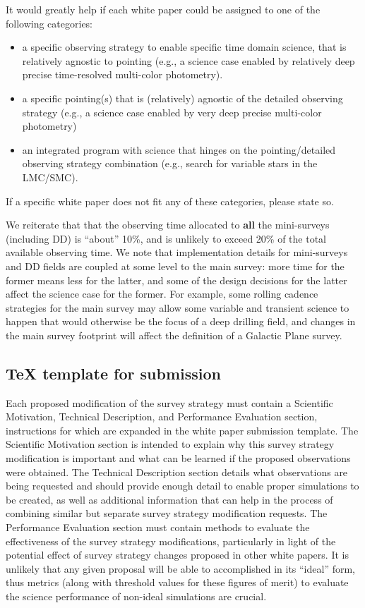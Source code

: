 \documentclass[DM,lsstdraft,toc,usenatbib]{lsstdoc}
\begin{document}
It would greatly help if each white paper could be assigned to one of the following
categories:  
\begin{itemize} 
\item a specific observing strategy to enable specific time domain science, 
	that is relatively agnostic to pointing (e.g., a science case enabled 
	by relatively deep precise time-resolved multi-color photometry). 
\item a specific pointing(s) that is (relatively) agnostic of the detailed observing 
	strategy (e.g., a science case enabled by very deep precise multi-color 
	photometry) 
\item an integrated program with science that hinges on the pointing/detailed 
	observing strategy combination (e.g., search for variable stars in the 
	LMC/SMC). 
\end{itemize}  
If a specific white paper does not fit any of these categories, please state so.

We reiterate that that the observing time allocated to {\bf all} the mini-surveys 
(including DD) is ``about'' 10\%, and is unlikely to exceed 20\% of the total available
observing time. We note that implementation details for mini-surveys and DD fields 
are coupled at some level to the main survey: more time for the former means less 
for the latter, and some of the design decisions for the latter affect the science
case for the former.  For example, some rolling cadence strategies for the main survey  
may allow some variable and transient science to happen that would otherwise be the 
focus of a deep drilling field, and changes in the main survey footprint will affect the 
definition of a Galactic Plane survey. 


\subsection{TeX template for submission \label{sec:textemplate}} 

Each proposed modification of the survey strategy must contain a Scientific Motivation, Technical Description, and Performance Evaluation section, instructions for which are expanded in the white paper submission template. The Scientific Motivation section is intended to explain why this survey strategy modification is important and what can be learned if the proposed observations were obtained. The Technical Description section details what observations are being requested and should provide enough detail to enable proper simulations to be created, as well as additional information that can help in the process of combining similar but separate survey strategy modification requests. The Performance Evaluation section must contain methods to evaluate the effectiveness of the survey strategy modifications, particularly in light of the potential effect of survey strategy changes proposed in other white papers. It is unlikely that any given proposal will be able to accomplished in its ``ideal'' form, thus metrics (along with threshold values for these figures of merit) to evaluate the science performance of non-ideal simulations are crucial. 
\end{document}
